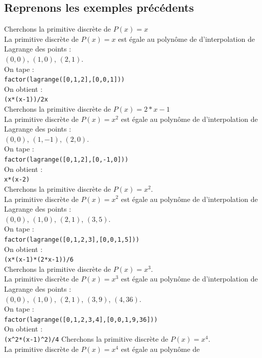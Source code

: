 \documentclass[a4paper,11pt]{book}
\begin{document}
\subsection{Reprenons les exemples pr\'ec\'edents}
Cherchons la primitive discr\`ete de $P(x)=x$\\
La primitive discr\`ete de $P(x)=x$ est \'egale au
 polyn\^ome de d'interpolation de Lagrange des points :\\
$(0,0)$, $(1,0)$, $(2,1)$.\\
On tape :\\
{\tt factor(lagrange([0,1,2],[0,0,1]))}\\
On obtient :\\
{\tt (x*(x-1))/2x}\\
Cherchons la primitive discr\`ete de $P(x)=2*x-1$\\
La primitive discr\`ete de $P(x)=x^2$ est \'egale au
 polyn\^ome de d'interpolation de Lagrange des points :\\
$(0,0)$, $(1,-1)$, $(2,0)$.\\
On tape :\\
{\tt factor(lagrange([0,1,2],[0,-1,0]))}\\
On obtient :\\
{\tt x*(x-2)}\\
Cherchons la primitive discr\`ete de $P(x)=x^2$.\\
La primitive discr\`ete de $P(x)=x^2$ est \'egale au polyn\^ome de 
d'interpolation de Lagrange des points :\\
$(0,0)$, $(1,0)$, $(2,1)$, $(3,5)$.\\
On tape :\\
{\tt factor(lagrange([0,1,2,3],[0,0,1,5]))}\\
On obtient :\\
{\tt (x*(x-1)*(2*x-1))/6}\\
Cherchons la primitive discr\`ete de $P(x)=x^3$.\\
La primitive discr\`ete de $P(x)=x^3$ est \'egale au polyn\^ome de 
d'interpolation de Lagrange des points :\\
$(0,0)$, $(1,0)$, $(2,1)$, $(3,9)$, $(4,36)$.\\
On tape :\\
{\tt factor(lagrange([0,1,2,3,4],[0,0,1,9,36]))}\\
On obtient :\\
{\tt (x\verb|^|2*(x-1)\verb|^|2)/4}
Cherchons la primitive discr\`ete de $P(x)=x^4$.\\
La primitive discr\`ete de $P(x)=x^4$ est \'egale au polyn\^ome de 
\end{document}

